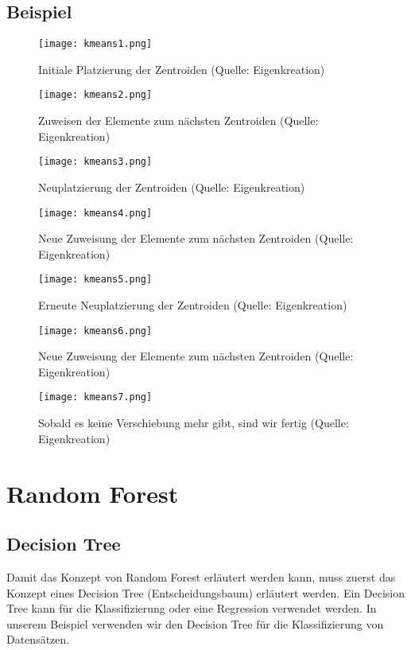 \subsection{Beispiel}
\begin{figure}[h!]
	\centering
	\texttt{[image: kmeans1.png]}
	\caption{Initiale Platzierung der Zentroiden (Quelle: Eigenkreation)}
\end{figure}

\begin{figure}[h!]
	\centering
	\texttt{[image: kmeans2.png]}
	\caption{Zuweisen der Elemente zum nächsten Zentroiden (Quelle: Eigenkreation)}
\end{figure}

\begin{figure}[h!]
	\centering
	\texttt{[image: kmeans3.png]}
	\caption{Neuplatzierung der Zentroiden (Quelle: Eigenkreation)}
\end{figure}

\begin{figure}[h!]
	\centering
	\texttt{[image: kmeans4.png]}
	\caption{Neue Zuweisung der Elemente zum nächsten Zentroiden (Quelle: Eigenkreation)}
\end{figure}

\begin{figure}[h!]
	\centering
	\texttt{[image: kmeans5.png]}
	\caption{Erneute Neuplatzierung der Zentroiden (Quelle: Eigenkreation)}
\end{figure}

\begin{figure}[h!]
	\centering
	\texttt{[image: kmeans6.png]}
	\caption{Neue Zuweisung der Elemente zum nächsten Zentroiden (Quelle: Eigenkreation)}
\end{figure}

\begin{figure}[h!]
	\centering
	\texttt{[image: kmeans7.png]}
	\caption{Sobald es keine Verschiebung mehr gibt, sind wir fertig (Quelle: Eigenkreation)}
\end{figure}

\clearpage
\section{Random Forest}
\subsection{Decision Tree}
Damit das Konzept von Random Forest erläutert werden kann, muss zuerst das Konzept eines Decision Tree (Entscheidungsbaum) erläutert werden. 
Ein Decision Tree kann für die Klassifizierung oder eine Regression verwendet werden. In unserem Beispiel verwenden wir den Decision Tree für die Klassifizierung von Datensätzen.


